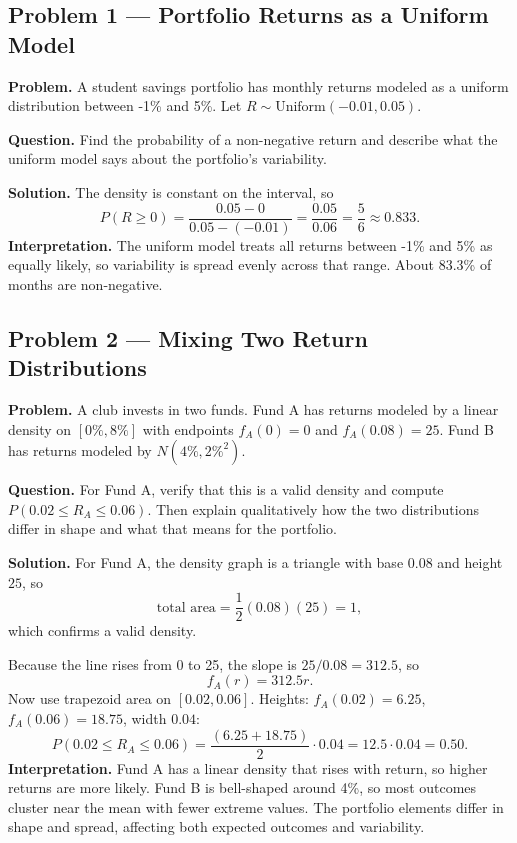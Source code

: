 	\begin{ExamProblems}
		
		\hypertarget{c8-ex1}{}
		\item
		\subsection*{Problem 1 — Portfolio Returns as a Uniform Model}
		
		\textbf{Problem.}
		A student savings portfolio has monthly returns modeled as a uniform distribution
		between -1\% and 5\%. Let \(R\sim\text{Uniform}(-0.01,0.05)\).
		
		\textbf{Question.} Find the probability of a non-negative return and describe what the uniform model
		says about the portfolio's variability.
		
		\textbf{Solution.}
		The density is constant on the interval, so
		\[
		P(R\ge 0)=\frac{0.05-0}{0.05-(-0.01)}=\frac{0.05}{0.06}=\frac{5}{6}\approx 0.833.
		\]
		\textbf{Interpretation.} The uniform model treats all returns between -1\% and 5\% as equally likely,
		so variability is spread evenly across that range. About 83.3\% of months are non-negative.
		
		
		\hypertarget{c8-ex2}{}
		\item
		\subsection*{Problem 2 — Mixing Two Return Distributions}
		
		\textbf{Problem.}
		A club invests in two funds. Fund A has returns modeled by a linear density on \([0\%,8\%]\)
		with endpoints \(f_A(0)=0\) and \(f_A(0.08)=25\). Fund B has returns modeled by \(N(4\%,2\%^2)\).
		
		\textbf{Question.} For Fund A, verify that this is a valid density and compute \(P(0.02\le R_A\le 0.06)\).
		Then explain qualitatively how the two distributions differ in shape and what that means for the portfolio.
		
		\textbf{Solution.}
		For Fund A, the density graph is a triangle with base \(0.08\) and height \(25\), so
		\[
		\text{total area}=\frac{1}{2}(0.08)(25)=1,
		\]
		which confirms a valid density.
		
		Because the line rises from 0 to 25, the slope is \(25/0.08=312.5\), so
		\[
		f_A(r)=312.5r.
		\]
		Now use trapezoid area on \([0.02,0.06]\).
		Heights: \(f_A(0.02)=6.25\), \(f_A(0.06)=18.75\), width \(0.04\):
		\[
		P(0.02\le R_A\le 0.06)=\frac{(6.25+18.75)}{2}\cdot 0.04=12.5\cdot 0.04=0.50.
		\]
		\textbf{Interpretation.} Fund A has a linear density that rises with return, so higher returns are more likely.
		Fund B is bell-shaped around 4\%, so most outcomes cluster near the mean with fewer extreme values.
		The portfolio elements differ in shape and spread, affecting both expected outcomes and variability.
		

\end{ExamProblems}
